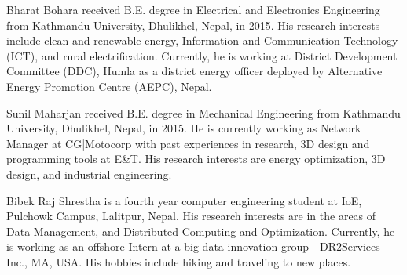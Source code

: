 \documentclass[journal,twoside]{IEEEtran}
\begin{document}
\newpage
\begin{IEEEbiography}{Bharat Bohara}
    received B.E. degree in Electrical and Electronics Engineering from Kathmandu University, Dhulikhel, Nepal, in 2015. His research interests include clean and renewable energy, Information and Communication Technology (ICT), and rural electrification. Currently, he is working at District Development Committee (DDC), Humla as a district energy officer deployed by Alternative Energy Promotion Centre (AEPC), Nepal.
\end{IEEEbiography}
\vspace{-12cm}
\begin{IEEEbiography}{Sunil Maharjan}
    received B.E. degree in Mechanical Engineering from Kathmandu University, Dhulikhel, Nepal, in 2015. He is currently working as Network Manager at CG|Motocorp with past experiences in research, 3D design and programming tools at E\&T. His research interests are energy optimization, 3D design, and industrial engineering.
\end{IEEEbiography}
\vspace{-12cm}
\begin{IEEEbiography}{Bibek Raj Shrestha}
    is a fourth year computer engineering student at IoE, Pulchowk Campus, Lalitpur, Nepal. His research interests are in the areas of Data Management, and Distributed Computing and Optimization. Currently, he is working as an offshore Intern at a big data innovation group - DR2Services Inc., MA, USA. His hobbies include hiking and traveling to new places.
\end{IEEEbiography}


\end{document}

